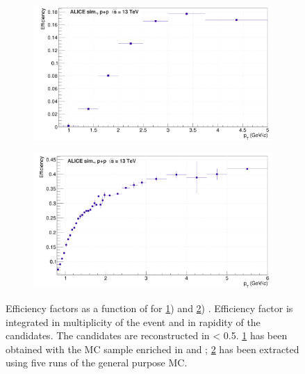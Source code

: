 \begin{figure}[h]
	\centering
	\begin{subfigure}[b]{.45\linewidth}
         \centering
         \includegraphics[width=1.\textwidth, angle=0, clip=true, trim=0cm 0 0 0]{Figures/Sec04_TrackSelections/EffOmega.png} 
         \caption{ }
         \label{fig:EffOmega}
    \end{subfigure}
    \hfill
    \begin{subfigure}[b]{.45\linewidth}
         \centering
         \includegraphics[width=1.\textwidth, angle=0, clip=true, trim=0cm 0 0 0cm]{Figures/Sec04_TrackSelections/EffPhi.png}
         \caption{ }
         \label{fig:EffPhi} 
    \end{subfigure}
    \hfill
\caption{Efficiency factors as a function of \pT for \ref{fig:EffOmega}) \rmOmega and \ref{fig:EffPhi}) \rmPhiMes . Efficiency factor is integrated in multiplicity of the event and in rapidity of the candidates. The candidates are reconstructed in \absrap < 0.5. \fig \ref{fig:EffOmega} has been obtained with the MC sample enriched in \rmXis and \rmOmegas ; \fig \ref{fig:EffPhi} has been extracted using five runs of the general purpose MC. }
	\label{fig:Eff}
\end{figure}

